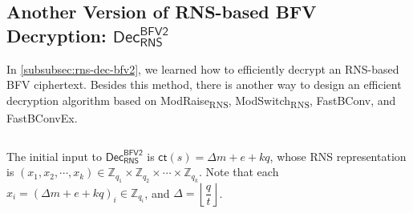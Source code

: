 \subsection{Another Version of RNS-based BFV Decryption: $\textsf{Dec}_{\textsf{RNS}}^{\textsf{BFV2}}$}
\label{subsubsec:rns-dec-bfv2}

In \autoref{subsubsec:rns-dec-bfv2}, we learned how to efficiently decrypt an RNS-based BFV ciphertext. Besides this method, there is another way to design an efficient decryption algorithm based on \textsf{ModRaise\textsubscript{RNS}}, \textsf{ModSwitch\textsubscript{RNS}}, \textsf{FastBConv}, and \textsf{FastBConvEx}. 

$ $

The initial input to $\textsf{Dec}_{\textsf{RNS}}^{\textsf{BFV2}}$ is $\textsf{ct}(s) = \Delta m + e + kq$, whose RNS representation is $(x_1, x_2, \cdots, x_k) \in \mathbb{Z}_{q_1} \times \mathbb{Z}_{q_2} \times \cdots \times \mathbb{Z}_{q_k}$. Note that each $x_i = (\Delta m + e + kq)_i \in \mathbb{Z}_{q_i}$, and $\Delta = \left\lfloor\dfrac{q}{t}\right\rfloor$.

$ $

